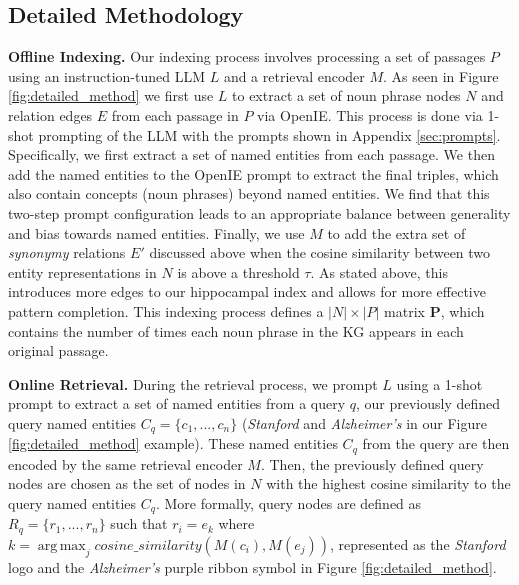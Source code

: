 \documentclass{article}
\DeclareMathOperator*{\argmax}{arg\,max}
\begin{document}
\subsection{Detailed Methodology}
\label{detailed_method}

\noindent \textbf{Offline Indexing.} Our indexing process involves processing a set of passages $P$ using an instruction-tuned LLM $L$ and a retrieval encoder $M$. 
As seen in Figure \ref{fig:detailed_method} we first use $L$ to extract a set of noun phrase nodes $N$ and relation edges $E$ from each passage in $P$ via OpenIE. 
This process is done via 1-shot prompting of the LLM with the prompts shown in Appendix \ref{sec:prompts}. 
Specifically, we first extract a set of named entities from each passage. 
We then add the named entities to the OpenIE prompt to extract the final triples, which also contain concepts (noun phrases) beyond named entities.
We find that this two-step prompt configuration leads to an appropriate balance between generality and bias towards named entities.
Finally, we use $M$ to add the extra set of \textit{synonymy} relations $E'$ discussed above when the cosine similarity between two entity representations in $N$ is above a threshold $\tau$.
As stated above, this introduces more edges to our hippocampal index and allows for more effective pattern completion.
This indexing process defines a $|N| \times |P|$ matrix $\mathbf{P}$, which contains the number of times each noun phrase in the KG appears in each original passage. 

\noindent \textbf{Online Retrieval.} During the retrieval process, we prompt $L$ using a 1-shot prompt to extract a set of named entities from a query $q$, our previously defined query named entities $C_q = \{c_1, ..., c_n\}$ (\textit{Stanford} and \textit{Alzheimer's} in our Figure \ref{fig:detailed_method} example).
These named entities $C_q$ from the query are then encoded by the same retrieval encoder $M$. 
Then, the previously defined query nodes are chosen as the set of nodes in $N$ with the highest cosine similarity to the query named entities $C_q$.
More formally, query nodes are defined as $R_q = \{r_1, ..., r_n\}$ such that $r_i = e_k$ where $k = \argmax_j cosine\_similarity(M(c_i), M(e_j))$, represented as the \textit{Stanford} logo and the \textit{Alzheimer's} purple ribbon symbol in Figure \ref{fig:detailed_method}.
\end{document}
